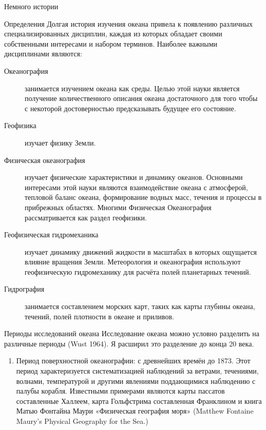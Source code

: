\begin{chapter}{Немного истории}
\begin{section}{Определения}
Долгая история изучения океана привела к появлению различных
специализированных дисциплин, каждая из которых обладает своими
собственными интересами и набором терминов. Наиболее важными
дисциплинами являются:

\begin{description}
\item[Океанография] занимается изучением океана как среды. Целью этой
науки является получение количественного описания океана достаточного
для того чтобы с некоторой достоверностью предсказывать будущее его
состояние.

\item[Геофизика] изучает физику Земли.

\item[Физическая океанография] изучает физические характеристики и
динамику океанов. Основными интересами этой науки являются
взаимодействие океана с атмосферой, тепловой баланс океана,
формирование водных масс, течения и процессы в прибрежных
областях. Многими Физическая Океанография рассматривается как раздел
геофизики.

\item[Геофизическая гидромеханика] изучает динамику движений жидкости
в масштабах в которых ощущается влияние вращения Земли. Метеорология и
океанография используют геофизическую гидромеханику для расчёта полей
планетарных течений.

\item[Гидрография] занимается составлением морских карт, таких как
карты глубины океана, течений, полей плотности в океане и приливов.
\end{description}
\end{section}

\begin{section}{Периоды исследований океана}
Исследование океана можно условно разделить на различные периоды 
(Wust 1964). Я расширил это разделение до конца 20 века.

\begin{enumerate}
\item  
Период поверхностной океанографии: с древнейших времён до 1873. Этот
период характеризуется систематизацией наблюдений за ветрами,
течениями, волнами, температурой и другими явлениями поддающимися
наблюдению с палубы корабля. Известными примерами являются карты
пассатов составленные Халлеем, карта Гольфстрима составленная
Франклином и книга Матью Фонтайна Маури «Физическая география моря»
(Matthew Fontaine Maury’s Physical Geography for the Sea.)


\end{enumerate}
\end{section}
\end{chapter}
